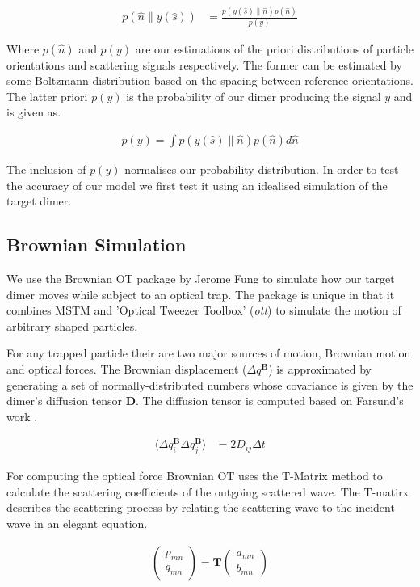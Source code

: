\documentclass[preprint,3p]{elsarticle}
\begin{document}
\begin{align}
	p(\hat{n}\parallel y(\hat{s}))&= \frac{p(y(\hat{s})\parallel\hat{n})p(\hat{n})}{p(y)}
\end{align}

Where $p(\hat{n})$ and $p(y)$ are our estimations of the priori distributions of particle orientations and scattering signals respectively. The former can be estimated by some Boltzmann distribution based on the spacing between reference orientations. The latter priori $p(y)$ is the probability of our dimer producing the signal $y$ and is given as. 

\begin{align}
	p(y) = \int p(y(\hat{s})\parallel \hat{n}) p(\hat{n}) d\hat{n}
\end{align}

The inclusion of $p(y)$ normalises our probability distribution. In order to test the accuracy of our model we first test it using an idealised simulation of the target dimer. 

\subsection{Brownian Simulation}
\label{sec:2.1}
We use the Brownian OT package by Jerome Fung \cite{Vigilante2020Brownian_OT} to simulate how our target dimer moves while subject to an optical trap. The package is unique in that it combines MSTM \cite{Mishchenko1996MSTM} and 'Optical Tweezer Toolbox' (\textit{ott}) to simulate the motion of arbitrary shaped particles. 

For any trapped particle their are two major sources of motion, Brownian motion and optical forces. The Brownian displacement ($\Delta q^{\textbf{B}}$) is approximated by generating a set of normally-distributed numbers whose covariance is given by the dimer's diffusion tensor $\textbf{D}$. The diffusion tensor is computed based on Farsund's work \cite{Farsund1996}. 

\begin{align}
	\langle \Delta q_i^{\textbf{B}} \Delta q_j^{\textbf{B}}\rangle &= 2D_{ij} \Delta t 
\end{align}

For computing the optical force Brownian OT uses the T-Matrix method to calculate the scattering coefficients of the outgoing scattered wave. The T-matirx describes the scattering process by relating the scattering wave to the incident wave in an elegant equation.

\begin{align}
	\begin{pmatrix}
		p_{mn} \\
		q_{mn}
	\end{pmatrix}
	= \textbf{T}
	\begin{pmatrix}
		a_{mn} \\
		b_{mn}
	\end{pmatrix}
\end{align}
\end{document}
